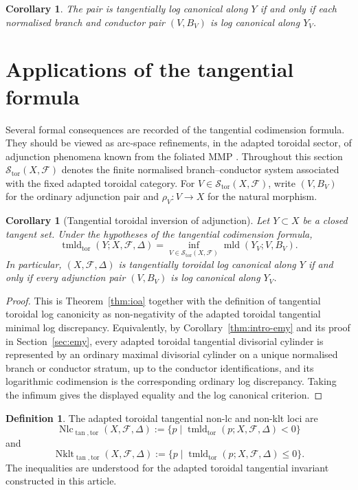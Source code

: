 \documentclass[11pt]{amsart}
\numberwithin{equation}{section}
\theoremstyle{plain}
\newtheorem{Corollary}[Theorem]{Corollary}
\theoremstyle{definition}
\newtheorem{Definition}[Theorem]{Definition}
\newcommand{\mld}{\operatorname{mld}}
\newcommand{\tmldtor}{\operatorname{tmld}_{\mathrm{tor}}}
\newcommand{\Nklt}{\operatorname{Nklt}}
\newcommand{\Nlc}{\operatorname{Nlc}}
\newcommand{\cF}{\mathcal F}
\begin{document}
\begin{Corollary}
The pair is tangentially log canonical along $Y$ if and only if each normalised branch and conductor pair $(V,B_V)$ is log canonical along $Y_V$.
\end{Corollary}


\section{Applications of the tangential formula}
\label{sec:applications}

Several formal consequences are recorded of the tangential codimension formula.
They should be viewed as arc-space refinements, in the adapted toroidal sector,
of adjunction phenomena known from the foliated MMP \cite{CSMMP,Spicer,SS,CSAdj}.  Throughout this section
\(\mathcal S_{\mathrm{tor}}(X,\cF)\) denotes the finite normalised
branch--conductor system associated with the fixed adapted toroidal category.
For \(V\in \mathcal S_{\mathrm{tor}}(X,\cF)\), write \((V,B_V)\) for the
ordinary adjunction pair and \(\rho_V:V\to X\) for the natural morphism.

\begin{Corollary}[Tangential toroidal inversion of adjunction]
\label{cor:tangential-ioa}
Let \(Y\subset X\) be a closed tangent set.  Under the hypotheses of the
tangential codimension formula,
\[
\tmldtor(Y;X,\cF,\Delta)
=
\inf_{V\in\mathcal S_{\mathrm{tor}}(X,\cF)}\mld(Y_V;V,B_V).
\]
In particular, \((X,\cF,\Delta)\) is tangentially toroidal log canonical
along \(Y\) if and only if every adjunction pair \((V,B_V)\) is log canonical
along \(Y_V\).
\end{Corollary}

\begin{proof}
This is Theorem~\ref{thm:ioa} together with the definition of tangential
toroidal log canonicity as non-negativity of the adapted toroidal tangential
minimal log discrepancy.  Equivalently, by Corollary~\ref{thm:intro-emy} and
its proof in Section~\ref{sec:emy}, every adapted toroidal tangential
divisorial cylinder is represented by an ordinary maximal divisorial cylinder
on a unique normalised branch or conductor stratum, up to the conductor
identifications, and its logarithmic codimension is the corresponding ordinary
log discrepancy.  Taking the infimum gives the displayed equality and the log
canonical criterion.
\end{proof}

\begin{Definition}
The adapted toroidal tangential non-lc and non-klt loci are
\[
\Nlc_{\tan,\mathrm{tor}}(X,\cF,\Delta)
:=\{p\mid \tmldtor(p;X,\cF,\Delta)<0\}
\]
and
\[
\Nklt_{\tan,\mathrm{tor}}(X,\cF,\Delta)
:=\{p\mid \tmldtor(p;X,\cF,\Delta)\le 0\}.
\]
The inequalities are understood for the adapted toroidal tangential
invariant constructed in this article.
\end{Definition}
\end{document}
